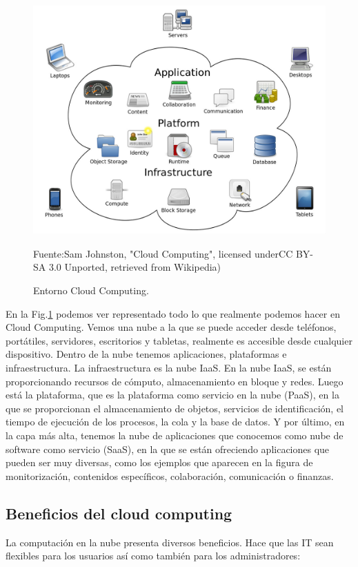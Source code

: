 \begin{figure}
    \centering
    \includegraphics[width=1\textwidth]{imagenes/capitulo1/cloudcomputingDoit.png}
    \caption{Entorno Cloud Computing.}
	\vspace{0.3cm}
    \footnotesize{Fuente:Sam Johnston, "Cloud Computing", licensed underCC BY-SA 3.0 Unported, retrieved from Wikipedia)}
    \label{cloudcomputingDoit}
\end{figure}

En la Fig.\ref{cloudcomputingDoit} podemos ver representado todo lo que realmente podemos hacer en Cloud Computing. Vemos una nube a la que se puede acceder desde teléfonos, portátiles, servidores, escritorios y tabletas, realmente  es accesible desde  cualquier dispositivo. Dentro de la nube tenemos aplicaciones, plataformas e infraestructura. La infraestructura es la nube IaaS. En la nube IaaS, se están proporcionando recursos de cómputo, almacenamiento en bloque y redes. Luego está la plataforma, que es la plataforma como servicio en la nube (PaaS), en la que se proporcionan el almacenamiento de objetos, servicios de identificación, el tiempo de ejecución de los procesos, la cola y la base de datos. Y por último, en la capa más alta, tenemos la nube de aplicaciones que conocemos como nube de software como servicio (SaaS), en la que se están ofreciendo aplicaciones que pueden ser muy diversas, como los ejemplos que aparecen en la figura de monitorización, contenidos específicos, colaboración, comunicación o finanzas.

\subsection{Beneficios del cloud computing}
La computación en la nube presenta diversos beneficios. Hace que las IT sean flexibles para los usuarios así como también para los administradores:


